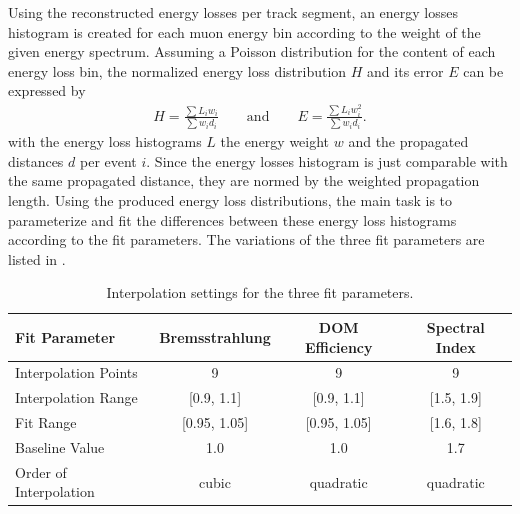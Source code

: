 Using the reconstructed energy losses per track segment, an energy losses histogram is created for each muon energy bin according to the weight of the given energy spectrum.
Assuming a Poisson distribution for the content of each energy loss bin, the normalized energy loss distribution $H$ and its error $E$ can be expressed by
\begin{align}
    H = \frac{\sum L_i w_i}{\sum w_i d_i}
    \qquad \text{and} \qquad
    E = \frac{\sum L_i w_i^2}{\sum w_i d_i}.
\end{align}
with the energy loss histograms $L$ the energy weight $w$ and the propagated distances $d$ per event $i$.
Since the energy losses histogram is just comparable with the same propagated distance, they are normed by the weighted propagation length.
Using the produced energy loss distributions, the main task is to parameterize and fit the differences between these energy loss histograms according to the fit parameters.
The variations of the three fit parameters are listed in .
\begin{table}
    \caption{Interpolation settings for the three fit parameters.}
    \label{tab:study_interpol_set}
    \centering
    \begin{tabular}{l ccc}
        \toprule
        Fit Parameter & Bremsstrahlung & DOM Efficiency & Spectral Index \\
        \midrule
        Interpolation Points & 9 & 9 & 9 \\
        Interpolation Range & [0.9, 1.1] & [0.9, 1.1] & [1.5, 1.9] \\
        Fit Range & [0.95, 1.05] & [0.95, 1.05] & [1.6, 1.8] \\
        Baseline Value & 1.0 & 1.0 & 1.7 \\
        Order of Interpolation & cubic & quadratic & quadratic \\
        \bottomrule
    \end{tabular}
\end{table}

